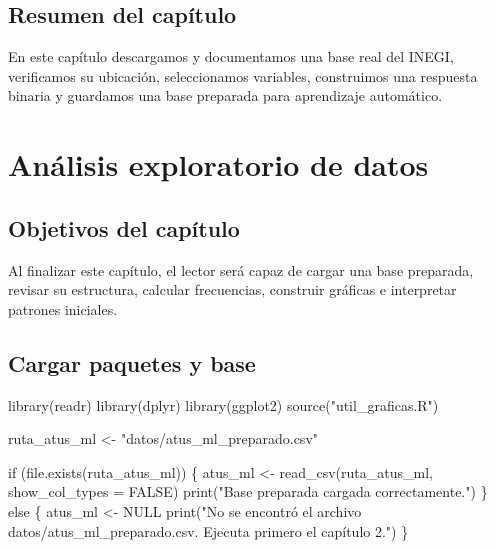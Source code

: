 \documentclass[
  spanish,
  10.5pt,
  letterpaper,
  openany,
  headings=big]{scrbook}
\newenvironment{Shaded}{}{}
\newcommand{\AttributeTok}[1]{\textcolor[rgb]{0.84,0.23,0.29}{#1}}
\newcommand{\ConstantTok}[1]{\textcolor[rgb]{0.00,0.36,0.77}{#1}}
\newcommand{\ControlFlowTok}[1]{\textcolor[rgb]{0.84,0.23,0.29}{#1}}
\newcommand{\FunctionTok}[1]{\textcolor[rgb]{0.44,0.26,0.76}{#1}}
\newcommand{\NormalTok}[1]{\textcolor[rgb]{0.14,0.16,0.18}{#1}}
\newcommand{\OtherTok}[1]{\textcolor[rgb]{0.44,0.26,0.76}{#1}}
\newcommand{\StringTok}[1]{\textcolor[rgb]{0.01,0.18,0.38}{#1}}
\begin{document}
\section{Resumen del capítulo}\label{resumen-del-capuxedtulo}

En este capítulo descargamos y documentamos una base real del INEGI,
verificamos su ubicación, seleccionamos variables, construimos una
respuesta binaria y guardamos una base preparada para aprendizaje
automático.


\chapter{Análisis exploratorio de
datos}\label{anuxe1lisis-exploratorio-de-datos}

\section{Objetivos del capítulo}\label{objetivos-del-capuxedtulo-2}

Al finalizar este capítulo, el lector será capaz de cargar una base
preparada, revisar su estructura, calcular frecuencias, construir
gráficas e interpretar patrones iniciales.

\section{Cargar paquetes y base}\label{cargar-paquetes-y-base}

\begin{Shaded}
\begin{Highlighting}[]
\FunctionTok{library}\NormalTok{(readr)}
\FunctionTok{library}\NormalTok{(dplyr)}
\FunctionTok{library}\NormalTok{(ggplot2)}
\FunctionTok{source}\NormalTok{(}\StringTok{"util\_graficas.R"}\NormalTok{)}

\NormalTok{ruta\_atus\_ml }\OtherTok{\textless{}{-}} \StringTok{"datos/atus\_ml\_preparado.csv"}

\ControlFlowTok{if}\NormalTok{ (}\FunctionTok{file.exists}\NormalTok{(ruta\_atus\_ml)) \{}
\NormalTok{  atus\_ml }\OtherTok{\textless{}{-}} \FunctionTok{read\_csv}\NormalTok{(ruta\_atus\_ml, }\AttributeTok{show\_col\_types =} \ConstantTok{FALSE}\NormalTok{)}
  \FunctionTok{print}\NormalTok{(}\StringTok{"Base preparada cargada correctamente."}\NormalTok{)}
\NormalTok{\} }\ControlFlowTok{else}\NormalTok{ \{}
\NormalTok{  atus\_ml }\OtherTok{\textless{}{-}} \ConstantTok{NULL}
  \FunctionTok{print}\NormalTok{(}\StringTok{"No se encontró el archivo datos/atus\_ml\_preparado.csv. Ejecuta primero el capítulo 2."}\NormalTok{)}
\NormalTok{\}}
\end{Highlighting}
\end{Shaded}
\end{document}
